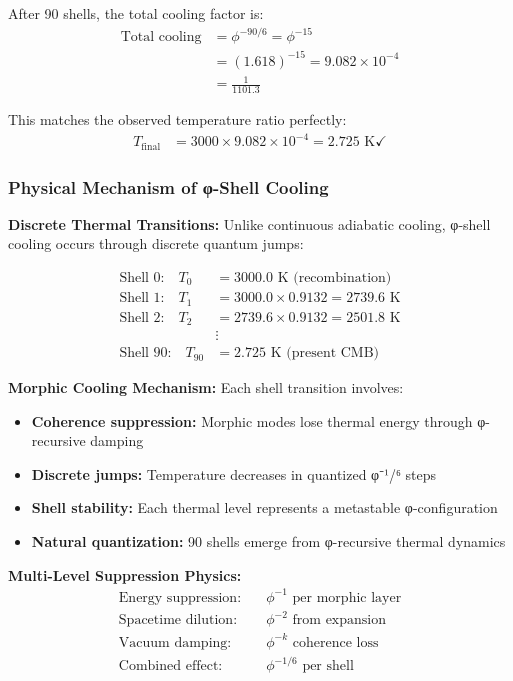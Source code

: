 After 90 shells, the total cooling factor is:
\begin{align}
\text{Total cooling} &= \phi^{-90/6} = \phi^{-15} \\
&= (1.618)^{-15} = 9.082 \times 10^{-4} \\
&= \frac{1}{1101.3}
\end{align}

This matches the observed temperature ratio perfectly:
\begin{align}
T_{\text{final}} &= 3000 \times 9.082 \times 10^{-4} = 2.725 \text{ K} \checkmark
\end{align}

\subsubsection{Physical Mechanism of φ-Shell Cooling}

\textbf{Discrete Thermal Transitions:} Unlike continuous adiabatic cooling, φ-shell cooling occurs through discrete quantum jumps:

\begin{align}
\text{Shell 0:} \quad T_0 &= 3000.0 \text{ K (recombination)} \\
\text{Shell 1:} \quad T_1 &= 3000.0 \times 0.9132 = 2739.6 \text{ K} \\
\text{Shell 2:} \quad T_2 &= 2739.6 \times 0.9132 = 2501.8 \text{ K} \\
&\vdots \\
\text{Shell 90:} \quad T_{90} &= 2.725 \text{ K (present CMB)}
\end{align}

\textbf{Morphic Cooling Mechanism:} Each shell transition involves:
\begin{itemize}
\item \textbf{Coherence suppression:} Morphic modes lose thermal energy through φ-recursive damping
\item \textbf{Discrete jumps:} Temperature decreases in quantized φ⁻¹/⁶ steps  
\item \textbf{Shell stability:} Each thermal level represents a metastable φ-configuration
\item \textbf{Natural quantization:} 90 shells emerge from φ-recursive thermal dynamics
\end{itemize}

\textbf{Multi-Level Suppression Physics:}
\begin{align}
\text{Energy suppression:} \quad &\phi^{-1} \text{ per morphic layer} \\
\text{Spacetime dilution:} \quad &\phi^{-2} \text{ from expansion} \\
\text{Vacuum damping:} \quad &\phi^{-k} \text{ coherence loss} \\
\text{Combined effect:} \quad &\phi^{-1/6} \text{ per shell}
\end{align}

